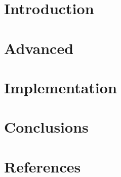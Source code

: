 \section[Intro]{Introduction}


\section[Adv]{Advanced}


\section[Impl]{Implementation}


\section[Concl]{Conclusions}


\section[Refs]{References}
